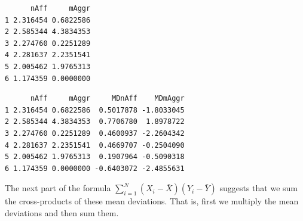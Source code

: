 \documentclass[
  11pt,
]{book}
\newenvironment{Shaded}{\begin{snugshade}}{\end{snugshade}}
\newcommand{\CommentTok}[1]{\textcolor[rgb]{0.56,0.35,0.01}{\textit{#1}}}
\newcommand{\FunctionTok}[1]{\textcolor[rgb]{0.00,0.00,0.00}{#1}}
\newcommand{\NormalTok}[1]{#1}
\newcommand{\OtherTok}[1]{\textcolor[rgb]{0.56,0.35,0.01}{#1}}
\newcommand{\SpecialCharTok}[1]{\textcolor[rgb]{0.00,0.00,0.00}{#1}}
\begin{document}
\begin{verbatim}
      nAff     mAggr
1 2.316454 0.6822586
2 2.585344 4.3834353
3 2.274760 0.2251289
4 2.281637 2.2351541
5 2.005462 1.9765313
6 1.174359 0.0000000
\end{verbatim}

\begin{Shaded}
\end{Shaded}

\begin{verbatim}
      nAff     mAggr     MDnAff    MDmAggr
1 2.316454 0.6822586  0.5017878 -1.8033045
2 2.585344 4.3834353  0.7706780  1.8978722
3 2.274760 0.2251289  0.4600937 -2.2604342
4 2.281637 2.2351541  0.4669707 -0.2504090
5 2.005462 1.9765313  0.1907964 -0.5090318
6 1.174359 0.0000000 -0.6403072 -2.4855631
\end{verbatim}

The next part of the formula \(\sum_{i=1}^N \left( X_i - \bar{X} \right) \left( Y_i - \bar{Y} \right)\) suggests that we sum the cross-products of these mean deviations. That is, first we multiply the mean deviations and then sum them.

\begin{Shaded}
\end{Shaded}
\end{document}
